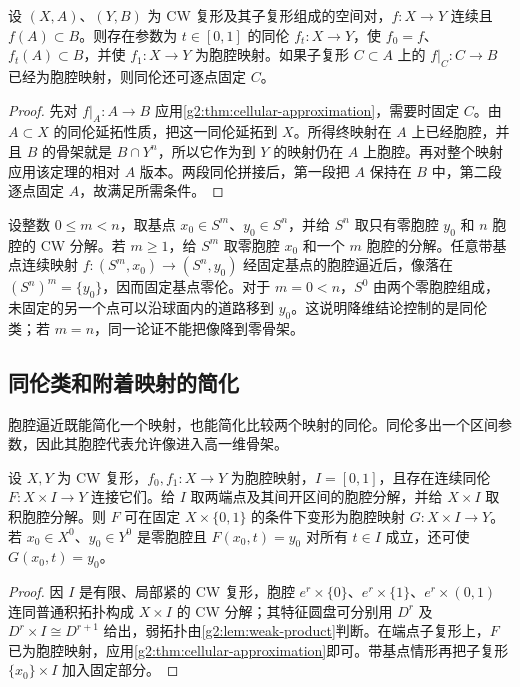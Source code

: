\begin{corollary}\label{g2:cor:cellular-pairs}
	设 \((X,A)\)、\((Y,B)\) 为 CW 复形及其子复形组成的空间对，\(f:X\to Y\) 连续且 \(f(A)\subset B\)。则存在参数为 \(t\in[0,1]\) 的同伦 \(f_t:X\to Y\)，使 \(f_0=f\)、\(f_t(A)\subset B\)，并使 \(f_1:X\to Y\) 为胞腔映射。如果子复形 \(C\subset A\) 上的 \(f|_C:C\to B\) 已经为胞腔映射，则同伦还可逐点固定 \(C\)。
\end{corollary}
\begin{proof}
	先对 \(f|_A:A\to B\) 应用\cref{g2:thm:cellular-approximation}，需要时固定 \(C\)。由 \(A\subset X\) 的同伦延拓性质，把这一同伦延拓到 \(X\)。所得终映射在 \(A\) 上已经胞腔，并且 \(B\) 的骨架就是 \(B\cap Y^n\)，所以它作为到 \(Y\) 的映射仍在 \(A\) 上胞腔。再对整个映射应用该定理的相对 \(A\) 版本。两段同伦拼接后，第一段把 \(A\) 保持在 \(B\) 中，第二段逐点固定 \(A\)，故满足所需条件。
\end{proof}

\begin{example}\label{g2:exm:lower-sphere-null}
	设整数 \(0\le m<n\)，取基点 \(x_0\in S^m\)、\(y_0\in S^n\)，并给 \(S^n\) 取只有零胞腔 \(y_0\) 和 \(n\) 胞腔的 CW 分解。若 \(m\ge1\)，给 \(S^m\) 取零胞腔 \(x_0\) 和一个 \(m\) 胞腔的分解。任意带基点连续映射 \(f:(S^m,x_0)\to(S^n,y_0)\) 经固定基点的胞腔逼近后，像落在 \((S^n)^m=\{y_0\}\)，因而固定基点零伦。对于 \(m=0<n\)，\(S^0\) 由两个零胞腔组成，未固定的另一个点可以沿球面内的道路移到 \(y_0\)。这说明降维结论控制的是同伦类；若 \(m=n\)，同一论证不能把像降到零骨架。
\end{example}

\subsection{同伦类和附着映射的简化}
\label{g2:subsec:0104:03}

胞腔逼近既能简化一个映射，也能简化比较两个映射的同伦。同伦多出一个区间参数，因此其胞腔代表允许像进入高一维骨架。

\begin{proposition}\label{g2:prop:cellular-homotopy}
	设 \(X,Y\) 为 CW 复形，\(f_0,f_1:X\to Y\) 为胞腔映射，\(I=[0,1]\)，且存在连续同伦 \(F:X\times I\to Y\) 连接它们。给 \(I\) 取两端点及其间开区间的胞腔分解，并给 \(X\times I\) 取积胞腔分解。则 \(F\) 可在固定 \(X\times\{0,1\}\) 的条件下变形为胞腔映射 \(G:X\times I\to Y\)。若 \(x_0\in X^0\)、\(y_0\in Y^0\) 是零胞腔且 \(F(x_0,t)=y_0\) 对所有 \(t\in I\) 成立，还可使 \(G(x_0,t)=y_0\)。
\end{proposition}
\begin{proof}
	因 \(I\) 是有限、局部紧的 CW 复形，胞腔 \(e^r\times\{0\}\)、\(e^r\times\{1\}\)、\(e^r\times(0,1)\) 连同普通积拓扑构成 \(X\times I\) 的 CW 分解；其特征圆盘可分别用 \(D^r\) 及 \(D^r\times I\cong D^{r+1}\) 给出，弱拓扑由\cref{g2:lem:weak-product}判断。在端点子复形上，\(F\) 已为胞腔映射，应用\cref{g2:thm:cellular-approximation}即可。带基点情形再把子复形 \(\{x_0\}\times I\) 加入固定部分。
\end{proof}

